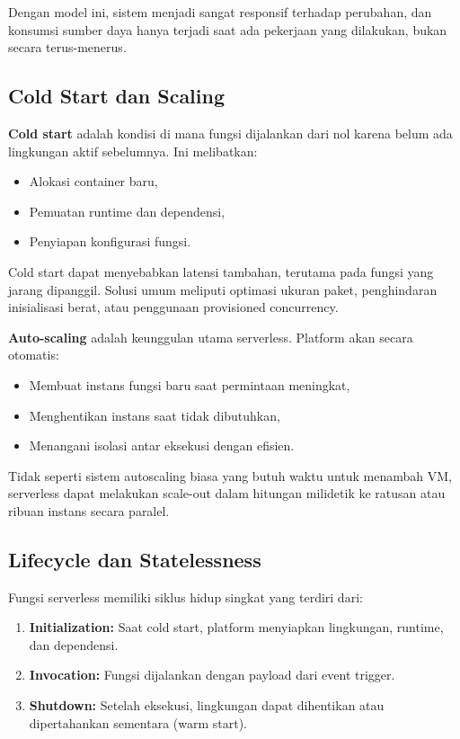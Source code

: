 Dengan model ini, sistem menjadi sangat responsif terhadap perubahan, dan konsumsi sumber daya hanya terjadi saat ada pekerjaan yang dilakukan, bukan secara terus-menerus.

\subsection{Cold Start dan Scaling}

\textbf{Cold start} adalah kondisi di mana fungsi dijalankan dari nol karena belum ada lingkungan aktif sebelumnya. Ini melibatkan:
\begin{itemize}
	\item Alokasi container baru,
	\item Pemuatan runtime dan dependensi,
	\item Penyiapan konfigurasi fungsi.
\end{itemize}

Cold start dapat menyebabkan latensi tambahan, terutama pada fungsi yang jarang dipanggil. Solusi umum meliputi optimasi ukuran paket, penghindaran inisialisasi berat, atau penggunaan provisioned concurrency.

\textbf{Auto-scaling} adalah keunggulan utama serverless. Platform akan secara otomatis:
\begin{itemize}
	\item Membuat instans fungsi baru saat permintaan meningkat,
	\item Menghentikan instans saat tidak dibutuhkan,
	\item Menangani isolasi antar eksekusi dengan efisien.
\end{itemize}

Tidak seperti sistem autoscaling biasa yang butuh waktu untuk menambah VM, serverless dapat melakukan scale-out dalam hitungan milidetik ke ratusan atau ribuan instans secara paralel.

\subsection{Lifecycle dan Statelessness}

Fungsi serverless memiliki siklus hidup singkat yang terdiri dari:
\begin{enumerate}
	\item \textbf{Initialization:} Saat cold start, platform menyiapkan lingkungan, runtime, dan dependensi.
	\item \textbf{Invocation:} Fungsi dijalankan dengan payload dari event trigger.
	\item \textbf{Shutdown:} Setelah eksekusi, lingkungan dapat dihentikan atau dipertahankan sementara (warm start).
\end{enumerate}


